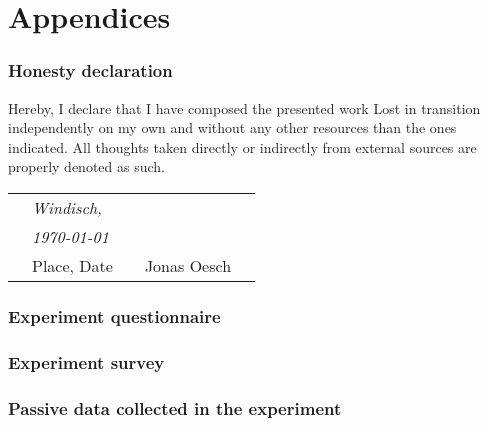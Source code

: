 \newpage
\appendix
\part{Appendices}

\section{Honesty declaration}
Hereby, I declare that I have composed the presented work Lost in transition independently on my own and without any other resources than the ones indicated. All thoughts taken directly or indirectly from external sources are properly denoted as such.
\vspace{3cm}

\centering
\begin{tabular}{p{10mm}>{\centering\arraybackslash}p{50mm}p{10mm}
>{\centering\arraybackslash}p{50mm}p{10mm}}
&\textit{\large Windisch,}&&& \\
&\textit{\large  \today}&&\hrulefill& \\
&\small Place, Date&&\small Jonas Oesch&
\end{tabular}

\newpage
\section{Experiment questionnaire} \label{appendix-questionnaire}

\section{Experiment survey} \label{appendix-survey}

\section{Passive data collected in the experiment} \label{appendix-passivedata}

